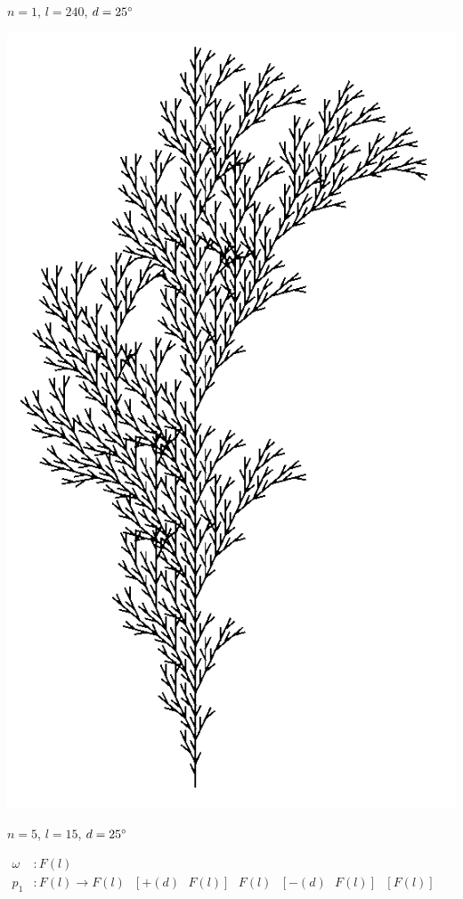 \begin{center}
\begin{minipage}[c]{0.45\textwidth}
		$n=1$, $l=240$, $d=25\degree$
	\end{minipage}
	\begin{minipage}[c]{0.45\textwidth}
		\centering
		\includegraphics[height=.75\textheight]{images/CH2_Branching2_N5L15D25.png}
		
		$n=5$, $l=15$, $d=25\degree$
	\end{minipage}
	\vspace{0.075\textheight}
	
	$\begin{array}{ll}
	\omega & : F(l) \\
	p_1 & : F(l) \rightarrow F(l)\text{ }[+(d)\text{ }F(l)]\text{ }F(l)\text{ }[-(d)\text{ }F(l)]\text{ }[F(l)]
	\end{array}$
\end{center}



